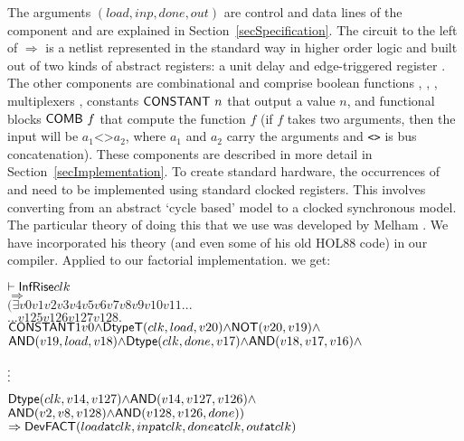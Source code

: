 \documentclass{llncs}
\begin{document}
The arguments $(load,inp,done,out)$ are control and data lines of the
component and are explained in Section~\ref{secSpecification}. The
circuit to the left of $\Rightarrow$ is a netlist represented in the
standard way in higher order logic \cite{Mel93} and built out of two
kinds of abstract registers: a unit delay  and edge-triggered
register . The other components are combinational and
comprise boolean functions ,
, , multiplexers , constants $\mathsf{CONSTANT}~n$ that output a value $n$,
and functional blocks
$\mathsf{COMB}~f$ that compute the function $f$ (if $f$ takes two arguments,
then the input will be $a_1\texttt{<>}a_2$, where $a_1$ and $a_2$ carry the arguments
and \texttt{<>} is bus concatenation). These components are
described in more detail in Section~\ref{secImplementation}. To
create standard hardware, the occurrences of
 and  need to be implemented using standard
clocked registers. This involves converting from an abstract `cycle
based' model to a clocked synchronous model. The particular theory of
doing this that we use was developed by Melham \cite{Mel93}. We have
incorporated his theory (and even some of his old HOL88 code) in
our compiler. Applied to our factorial implementation.
we get:


{\baselineskip10pt\begin{alltt}
\( \vdash \DEF{InfRise} clk                                                                        \)
\(   \Rightarrow                                                                                   \)
\(   ({\exists}v0 v1 v2 v3 v4 v5 v6 v7 v8 v9 v10 v11 ...                               \)
\(     ... v125 v126 v127 v128.                                                                   \)
\(     \DEF{CONSTANT} 1 v0 {\wedge} \DEF{DtypeT}(clk,load,v20) {\wedge} \DEF{NOT}(v20,v19) {\wedge}        \)
\(     \DEF{AND}(v19,load,v18) {\wedge} \DEF{Dtype}(clk,done,v17) {\wedge} \DEF{AND}(v18,v17,v16) {\wedge} \)

       \(\raisebox{3mm}{\vdots}\)
\(     \DEF{Dtype}(clk,v14,v127) {\wedge} \DEF{AND}(v14,v127,v126) {\wedge}  \)
\(     \DEF{AND} (v2,v8,v128) {\wedge} \DEF{AND}(v128,v126,done))               \)
\(   \Rightarrow \DEF{Dev} \DEF{FACT} (load \DEF{at} clk, inp \DEF{at} clk, done \DEF{at} clk, out \DEF{at} clk) \)
\end{alltt}}

\end{document}
